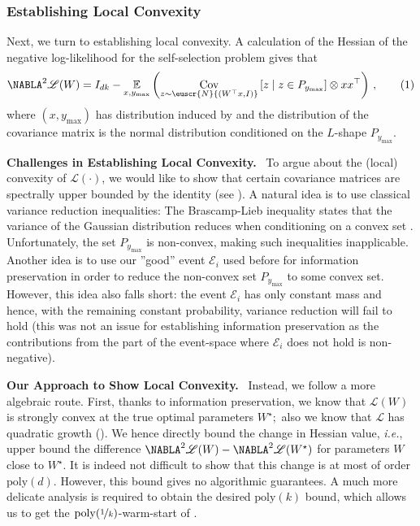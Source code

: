 \documentclass[11pt,letterpaper]{article}
\makeatletter
\theoremstyle{plain}
\theoremstyle{definition}
\theoremstyle{remark}
\newcommand{\yesnum}{\addtocounter{equation}{1}\tag{\theequation}}
\renewcommand{\eqref}[1]{\textup{\eqrefform@{\ref{#1}}}}
\let\eqrefform@\tagform@
\newcommand{\inparen}[1]{\ensuremath{\left(#1\right)}}
\newcommand{\insquare}[1]{\ensuremath{\left[#1\right]}}
\newcommand{\evE}{\ensuremath{\mathscr{E}}}
\newcommand{\E}{\operatornamewithlimits{\mathbb{E}}}
\newcommand{\Ex}{\E}
\newcommand{\cov}{\ensuremath{\operatornamewithlimits{\rm Cov}}}
\newcommand{\nfrac}[2]{\nicefrac{#1}{#2}}
\newcommand{\poly}{\mathrm{poly}}
\newcommand*{\Nabla}{\boldsymbol\NABLA}
\let\nabla\Nabla
\newcommand{\customcal}[1]{\euscr{#1}}
\newcommand{\cL}{\customcal{L}}
\newcommand{\cN}{\customcal{N}}
\renewcommand{\paragraph}[1]{\medskip \noindent\textbf{#1}~}
\newcommand{\ie}{\emph{i.e.}}
\newcommand{\negLL}{\ensuremath{\mathscr{L}}}
\newcommand{\normal}[2]{\cN{\inparen{#1,#2}}}
\newcommand{\ymax}{y_{\max}}
\renewcommand{\cL}{\negLL}
\makeatother
\begin{document}
       
    
\subsubsection*{{Establishing} Local Convexity}  Next, we turn to establishing local convexity.
A calculation of the Hessian of the negative log-likelihood for the self-selection problem gives that
\[
\nabla^2 \cL(W) = I_{dk} - \Ex_{x,\ymax}\inparen{
            \cov_{z\sim \normal{W^\top x}{I}}\insquare{z\mid z\in P_{\ymax}}
            \otimes xx^\top}\,,
            \yesnum\label{eq:convexity:intro:1}
\]
where $(x,y_{\max})$ has {distribution} induced by  and the distribution of the covariance matrix is the normal distribution conditioned on the $L$-shape $P_{y_{\max}}$. 

\paragraph{{Challenges in Establishing Local Convexity.}}
To argue about the (local) convexity of $\cL(\cdot)$, we would like to show that certain covariance {matrices} are spectrally upper bounded by the identity (see \eqref{eq:convexity:intro:1}). 
A natural idea is to use classical variance reduction inequalities:
The Brascamp-Lieb inequality states that the variance of the Gaussian distribution reduces when conditioning on a convex set \cite{harge2004convex}. Unfortunately,
the set $P_{y_{\max}}$ is non-convex,
{making} such inequalities {inapplicable}. 
{Another} idea is to use our ''good'' event $\evE_i$ used before for information preservation in order to reduce the non-convex set $P_{y_{\max}}$ to some convex set. However, this idea {also} falls short: the event $\evE_i$ has only constant mass and hence, with the remaining constant probability,  variance reduction will fail to hold {(this was not an issue for establishing information preservation as the contributions from the part of the event-space where $\evE_i$ does not hold is non-negative)}. %

\paragraph{Our Approach to Show Local Convexity.}
Instead, we follow a more algebraic route. First, thanks to information preservation, we know that $\cL(W)$ is strongly convex at the true optimal parameters $W^\star;$ also we know that $\cL$ has quadratic growth ().
We hence directly bound the 
change in Hessian value, \ie{}, upper bound the difference $\nabla^2 \cL(W) - \nabla^2 \cL(W^\star)$ for parameters $W$ close to $W^\star$. 
It is indeed not difficult to show that this change is at most of order $\poly(d).$ 
However, this bound gives no algorithmic guarantees. A much more delicate analysis is required to obtain the desired $\poly(k)$ bound, which allows us to get the $\poly(\nfrac{1}{k})$-warm-start of . 
\end{document}
